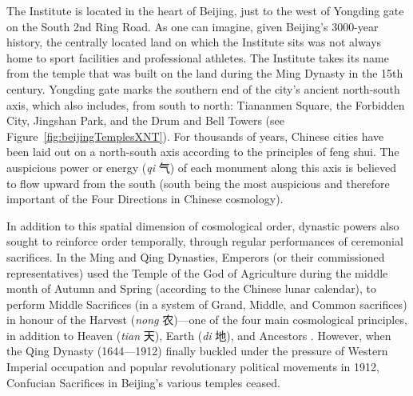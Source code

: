 \begin{CJK}{UTF8}{gbsn}
The Institute is located in the heart of Beijing, just to the west of Yongding gate on the South 2nd Ring Road. As one can imagine, given Beijing's 3000-year history, the centrally located land on which the Institute sits was not always home to sport facilities and professional athletes.  The Institute takes its name from the temple that was built on the land during the Ming Dynasty in the 15th century.  Yongding gate marks the southern end of the city's ancient north-south axis, which also includes, from south to north: Tiananmen Square, the Forbidden City, Jingshan Park, and the Drum and Bell Towers (see Figure~\ref{fig:beijingTemplesXNT}).  For thousands of years, Chinese cities have been laid out on a north-south axis according to the principles of feng shui. The auspicious power or energy (\textit{qi} 气) of each monument along this axis is believed to flow upward from the south (south being the most auspicious and therefore important of the Four Directions in Chinese cosmology).

In addition to this spatial dimension of cosmological order, dynastic powers also sought to reinforce order temporally, through regular performances of ceremonial sacrifices.  In the Ming and Qing Dynasties, Emperors (or their commissioned representatives) used the Temple of the God of Agriculture during the middle month of Autumn and Spring (according to the Chinese lunar calendar), to perform Middle Sacrifices (in a system of Grand, Middle, and Common sacrifices) in honour of the Harvest (\textit{nong} 农)---one of the four main cosmological principles, in addition to Heaven (\textit{tian} 天), Earth (\textit{di} 地), and Ancestors \citep[\textit{zu} 祖; see][98]{Brownell2008}.  However, when the Qing Dynasty (1644---1912) finally buckled under the pressure of Western Imperial occupation and popular revolutionary political movements in 1912, Confucian Sacrifices in Beijing's various temples ceased.


\end{CJK}
